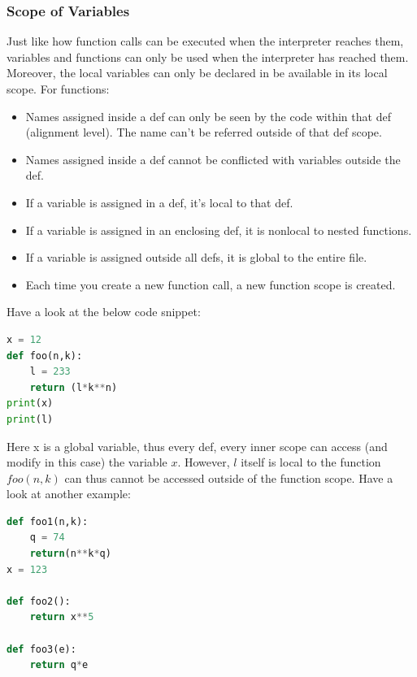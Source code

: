 \documentclass[twoside,final]{hcmut-report}
\begin{document}
\subsubsection{Scope of Variables}
\hspace*{1mm} Just like how function calls can be executed when the interpreter reaches them, variables and functions can only be used when the interpreter has reached them. Moreover, the local variables can only be declared in be available in its local scope. For functions:
\begin{itemize}

\item Names assigned inside a def can only be seen by the code within that def (alignment level). The name can't be referred outside of that def scope.
\item Names assigned inside a def cannot be conflicted with variables outside the def.
\item If a variable is assigned in a def, it's local to that def.
\item If a variable is assigned in an enclosing def, it is nonlocal to nested functions.
\item If a variable is assigned outside all defs, it is global to the entire file.
\item Each time you create a new function call, a new function scope is created.
\end{itemize}
\hspace*{6.5mm} Have a look at the below code snippet: 
\begin{lstlisting}[language=Python, caption=Scope Variable Error]
x = 12
def foo(n,k):
    l = 233
    return (l*k**n)
print(x)
print(l)
\end{lstlisting}
\hspace*{6.5mm} Here x is a global variable, thus every def, every inner scope can access (and modify in this case) the variable $x$. However, $l$ itself is local to the function $foo(n,k)$ can thus cannot be accessed outside of the function scope. Have a look at another example:
\begin{lstlisting}[language=Python, caption=Another Scope Variable Error]
def foo1(n,k):
    q = 74
    return(n**k*q)
x = 123

def foo2():
    return x**5 

def foo3(e):
    return q*e
\end{lstlisting}
\end{document}
